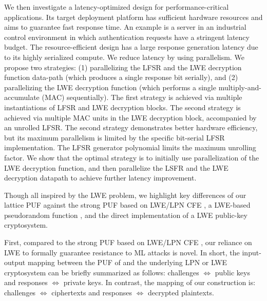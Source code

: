 We then investigate a latency-optimized design for performance-critical applications. 
Its target deployment platform has sufficient hardware resources and aims to guarantee fast response time. 
An example is a server in an industrial control environment in which authentication requests have a stringent latency budget. 
The resource-efficient design has a large response generation latency due to its highly serialized compute. 
We reduce latency by using parallelism. 
We propose two strategies: (1) parallelizing the LFSR and the LWE decryption function data-path (which produces a single response bit serially), and (2) parallelizing the LWE decryption function (which performs a single multiply-and-accumulate (MAC) sequentially). 
The first strategy is achieved via multiple instantiations of LFSR and LWE decryption blocks. 
The second strategy is achieved via multiple MAC units in the LWE decryption block, accompanied by an unrolled LFSR. 
The second strategy demonstrates better hardware efficiency, but its maximum parallelism is limited by the specific bit-serial LFSR implementation. 
The LFSR generator polynomial limits the maximum unrolling factor. 
We show that the optimal strategy is to initially use parallelization of the LWE decryption function, and then parallelize the LSFR and the LWE decryption datapath to achieve further latency improvement.

Though all inspired by the LWE problem, we highlight key differences of our lattice PUF against the strong PUF based on LWE/LPN CFE \cite{herder2017trapdoor,jin2017fpga}, a LWE-based pseudorandom function \cite{brenner2014fpga}, and the direct implementation of a LWE public-key cryptosystem.

First, compared to the strong PUF based on LWE/LPN CFE \cite{herder2017trapdoor,jin2017fpga}, our reliance on LWE to formally guarantee resistance to ML attacks is novel.
In short, the input-output mapping between the PUF of \cite{herder2017trapdoor,jin2017fpga} and the underlying LPN or LWE cryptosystem can be briefly summarized as follows: 
 challenges $\Longleftrightarrow$ public keys and responses $\Longleftrightarrow$  private keys. In contrast, the mapping of our construction is: challenges $\Longleftrightarrow$ ciphertexts and responses $\Longleftrightarrow$ decrypted plaintexts.

